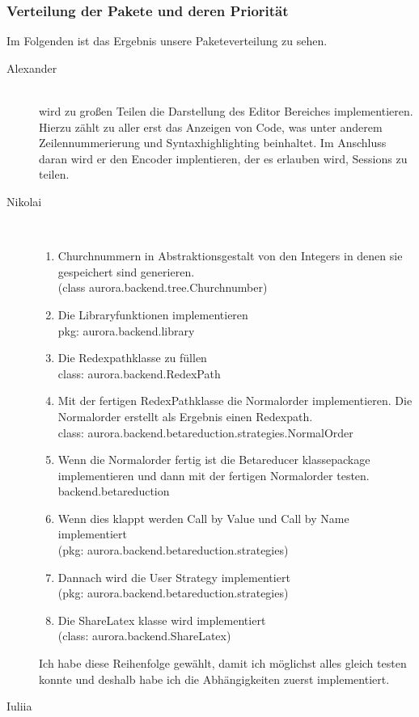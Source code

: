 \documentclass[parskip=full,11pt,twoside]{scrartcl}
\begin{document}
\subsubsection{Verteilung der Pakete und deren Priorität}
Im Folgenden ist das Ergebnis unsere Paketeverteilung zu sehen.
\begin{description}


    \item [Alexander]\hfill \\
      wird zu großen Teilen die Darstellung des Editor Bereiches implementieren.
        Hierzu zählt zu aller erst das Anzeigen von Code, was unter anderem Zeilennummerierung und Syntaxhighlighting beinhaltet.
        Im Anschluss daran wird er den Encoder implentieren, der es erlauben wird, Sessions zu teilen.
    \item [Nikolai]\hfill \\
    \begin{enumerate}
    \item Churchnummern in Abstraktionsgestalt von den Integers in denen sie gespeichert sind generieren. \\(class aurora.backend.tree.Churchnumber)
    \item  Die Libraryfunktionen implementieren \\pkg: aurora.backend.library
    \item Die Redexpathklasse zu füllen \\class: aurora.backend.RedexPath
    \item Mit der fertigen RedexPathklasse die Normalorder implementieren. Die Normalorder erstellt als Ergebnis einen Redexpath. \\class: aurora.backend.betareduction.strategies.NormalOrder
    \item Wenn die Normalorder fertig ist die Betareducer klassepackage implementieren und dann mit der fertigen Normalorder testen. backend.betareduction
    \item Wenn dies klappt werden Call by Value und Call by Name implementiert  \\(pkg: aurora.backend.betareduction.strategies)
\item Dannach wird die User Strategy implementiert \\(pkg: aurora.backend.betareduction.strategies)

\item Die ShareLatex klasse wird implementiert \\(class: aurora.backend.ShareLatex)
    \end{enumerate}
Ich habe diese Reihenfolge gewählt, damit ich möglichst alles gleich testen konnte und deshalb habe ich die Abhängigkeiten zuerst implementiert.
    \item [Iuliia]\hfill \\
    

\end{description}
\end{document}
